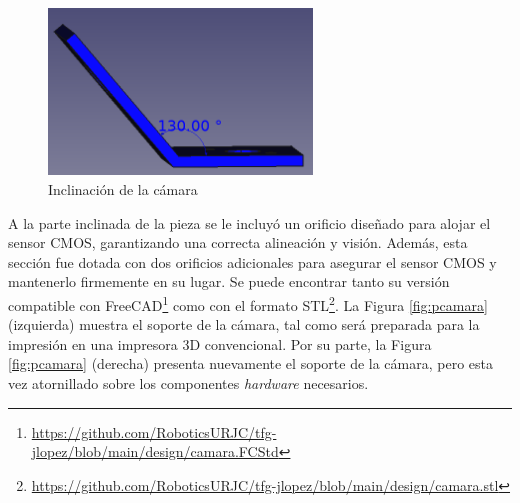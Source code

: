 \begin{figure} [h!]
	\begin{center}
		\includegraphics[width=7cm]{figs/cap5/rot.png}
	\end{center}
	\caption{Inclinación de la cámara} 
\label{fig:rot}
\end{figure}

A la parte inclinada de la pieza se le incluyó un orificio diseñado para alojar el sensor CMOS, garantizando una correcta alineación y visión. Además, esta sección fue dotada con dos orificios adicionales para asegurar el sensor CMOS y mantenerlo firmemente en su lugar. Se puede encontrar tanto su versión compatible con FreeCAD\footnote{\url{https://github.com/RoboticsURJC/tfg-jlopez/blob/main/design/camara.FCStd}} como con el formato STL\footnote{\url{https://github.com/RoboticsURJC/tfg-jlopez/blob/main/design/camara.stl}}. La Figura \ref{fig:pcamara} (izquierda) muestra el soporte de la cámara, tal como será preparada para la impresión en una impresora 3D convencional. Por su parte, la Figura \ref{fig:pcamara} (derecha) presenta nuevamente el soporte de la cámara, pero esta vez atornillado sobre los componentes \textit{hardware} necesarios. 

